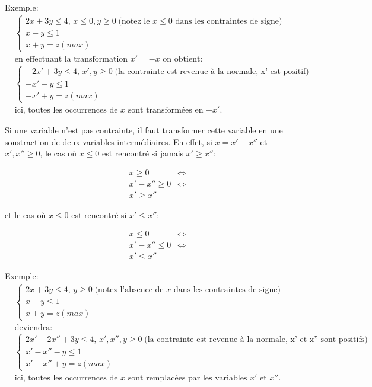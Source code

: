 \documentclass[a4paper, 11pt]{article}
\begin{document}
Exemple:
\[ \begin{aligned}
    &\begin{cases}
      2x + 3y \le 4 \text{, }x \le 0, y \ge 0  \; \text{(notez le } x \le 0 \text{ dans les contraintes de signe)}\\
      x - y \le 1 \\
      x + y = z (max)
    \end{cases} \\
	&\text{en effectuant la transformation $x' = -x$ on obtient:} \\
    &\begin{cases}
      -2x' + 3y \le 4 \text{, }x', y \ge 0  \; \text{(la contrainte est revenue à la normale, x' est positif)}\\
      -x' - y \le 1 \\
      -x' + y = z (max)
    \end{cases} \\
	&\text{ici, toutes les occurrences de $x$ sont transformées en $-x'$.}
	\end{aligned}
\]

Si une variable n'est pas contrainte, il faut transformer cette variable en une soustraction de deux variables intermédiaires.
En effet, si $x = x' - x''$ et $x', x'' \ge 0$, le cas où $x \le 0$ est rencontré si jamais $x' \ge x''$:

\[
  \begin{aligned}
    &x \ge 0 &\Leftrightarrow \\
    &x' - x'' \ge 0 &\Leftrightarrow \\
    &x' \ge x'' &
  \end{aligned}
\]

et le cas où $x \le 0$ est rencontré si $x' \le x''$:

\[
  \begin{aligned}
    &x \le 0 &\Leftrightarrow \\
    &x' - x'' \le 0 &\Leftrightarrow \\
    &x' \le x'' &
  \end{aligned}
\]

Exemple:
\[ \begin{aligned}
    &\begin{cases}
      2x + 3y \le 4 \text{, }y \ge 0  \; \text{(notez l'absence de } x \text{ dans les contraintes de signe)}\\
      x - y \le 1 \\
      x + y = z (max)
    \end{cases} \\
	&\text{deviendra:} \\
    &\begin{cases}
      2x' - 2x'' + 3y \le 4 \text{, }x', x'', y \ge 0  \; \text{(la contrainte est revenue à la normale, x' et x'' sont positifs)}\\
      x' - x'' - y \le 1 \\
      x' - x'' + y = z (max)
    \end{cases} \\
	&\text{ici, toutes les occurrences de $x$ sont remplacées par les variables $x'$ et $x''$.}
	\end{aligned}
\]
\end{document}
